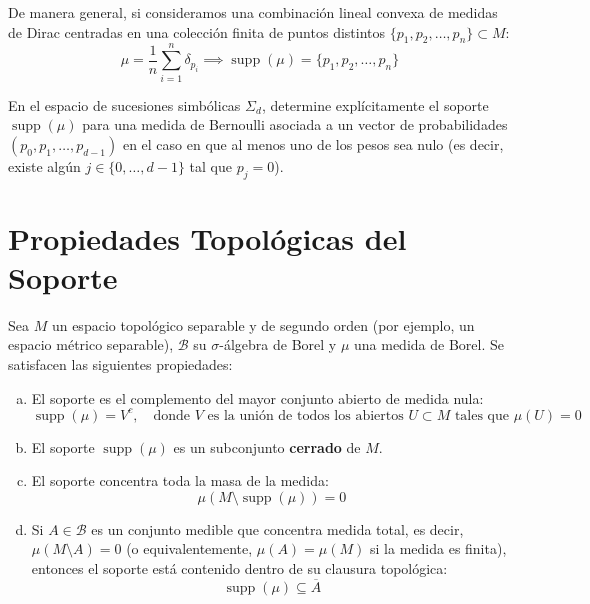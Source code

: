 \begin{ejemplo}
	De manera general, si consideramos una combinación lineal convexa de medidas de Dirac centradas en una colección finita de puntos distintos $\{p_1, p_2, \dots, p_n\} \subset M$:
	$$ \mu = \frac{1}{n} \sum_{i=1}^n \delta_{p_i} \implies \operatorname{supp}(\mu) = \{p_1, p_2, \dots, p_n\} $$
\end{ejemplo}

\begin{ejercicio}
	En el espacio de sucesiones simbólicas $\Sigma_d$, determine explícitamente el soporte $\operatorname{supp}(\mu)$ para una medida de Bernoulli asociada a un vector de probabilidades $(p_0, p_1, \dots, p_{d-1})$ en el caso en que al menos uno de los pesos sea nulo (es decir, existe algún $j \in \{0, \dots, d-1\}$ tal que $p_j = 0$).
\end{ejercicio}

\section{Propiedades Topológicas del Soporte}

\begin{proposicion} \label{prop:propiedades_soporte}
	Sea $M$ un espacio topológico separable y de segundo orden (por ejemplo, un espacio métrico separable), $\mathcal{B}$ su $\sigma$-álgebra de Borel y $\mu$ una medida de Borel. Se satisfacen las siguientes propiedades:
	\begin{enumerate}[a)]
		\item El soporte es el complemento del mayor conjunto abierto de medida nula:
		$$ \operatorname{supp}(\mu) = V^c, \quad \text{donde } V \text{ es la unión de todos los abiertos } U \subset M \text{ tales que } \mu(U) = 0 $$
		\item El soporte $\operatorname{supp}(\mu)$ es un subconjunto \textbf{cerrado} de $M$.
		\item El soporte concentra toda la masa de la medida:
		$$ \mu(M \setminus \operatorname{supp}(\mu)) = 0 $$
		\item Si $A \in \mathcal{B}$ es un conjunto medible que concentra medida total, es decir, $\mu(M \setminus A) = 0$ (o equivalentemente, $\mu(A) = \mu(M)$ si la medida es finita), entonces el soporte está contenido dentro de su clausura topológica:
		$$ \operatorname{supp}(\mu) \subseteq \overline{A} $$
	\end{enumerate}
\end{proposicion}

